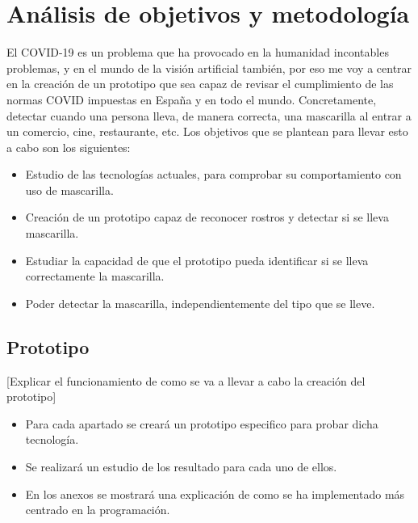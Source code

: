 
\lstset{frame=single,basicstyle=\ttfamily\small}

\chapter{Análisis de objetivos y metodología}

El COVID-19 es un problema que ha provocado en la humanidad incontables problemas, y en el mundo de la visión artificial también, por eso me voy a centrar en la creación de un prototipo que sea capaz de revisar el cumplimiento de las normas COVID impuestas en España y en todo el mundo. Concretamente, detectar cuando una persona lleva, de manera correcta, una mascarilla al entrar a un comercio, cine, restaurante, etc. Los objetivos que se plantean para llevar esto a cabo son los siguientes:

\begin{itemize}
	\item Estudio de las tecnologías actuales, para comprobar su comportamiento con uso de mascarilla.
	\item Creación de un prototipo capaz de reconocer rostros y detectar si se lleva mascarilla.
	\item Estudiar la capacidad de que el prototipo pueda identificar si se lleva correctamente la mascarilla. 
	\item Poder detectar la mascarilla, independientemente del tipo que se lleve.
\end{itemize}

\section{Prototipo}

[Explicar el funcionamiento de como se va a llevar a cabo la creación del prototipo]

\begin{itemize}
	\item Para cada apartado se creará un prototipo especifico para probar dicha tecnología.
	\item Se realizará un estudio de los resultado para cada uno de ellos.
	\item En los anexos se mostrará una explicación de como se ha implementado más centrado en la programación.
\end{itemize}